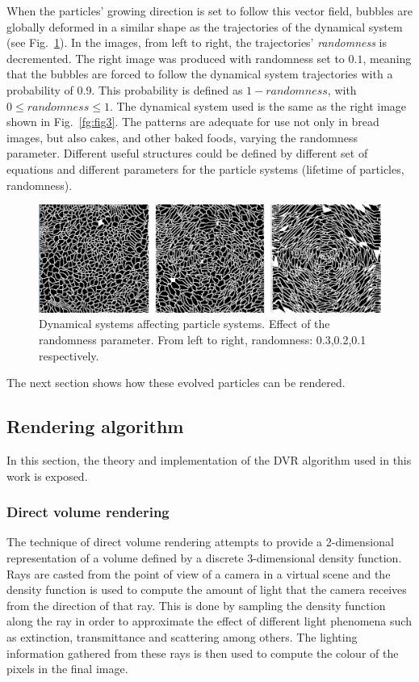 \documentclass[oneside,a4paper,spanish,links]{amca}
\begin{document}
When the particles' growing direction is set to follow this vector field, bubbles are globally deformed in a similar shape as the
trajectories of the dynamical system (see Fig.~\ref{fg:fig4}). In the
images, from left to right, the trajectories' {\em randomness} is decremented. The right image was produced with randomness set to $0.1$, meaning
that the bubbles are forced to follow the dynamical system
trajectories with a probability of 0.9. This probability is defined as
$1-randomness$, with $0 \leq randomness \leq 1$. The dynamical system
used is the same as the right image shown in Fig.~\ref{fg:fig3}.  The
patterns are adequate for use not only in bread images, but also
cakes, and other baked foods, varying the randomness
parameter. Different useful structures could be defined by different set of equations and different parameters for the
particle systems (lifetime of particles, randomness).


\begin{figure}[htb!]
  \centerline{\includegraphics[scale=0.21]{fig4}}
  \caption{Dynamical systems affecting particle systems. Effect of the randomness parameter. From left to right, randomness: 0.3,0.2,0.1 respectively. }
  \label{fg:fig4}
\end{figure}

The next section shows how these evolved particles can be rendered.

\subsection{Rendering algorithm}

In this section, the theory and implementation of the DVR algorithm used in this work is exposed.

\subsubsection{Direct volume rendering}

The technique of direct volume rendering attempts to provide a
2-dimensional representation of a volume defined by a discrete
3-dimensional density function. Rays are casted from the point of view
of a camera in a virtual scene and the density function is used to
compute the amount of light that the camera receives from the
direction of that ray. This is done by sampling the density function
along the ray in order to approximate the effect of different light
phenomena such as extinction, transmittance and scattering among
others. The lighting information gathered from these rays is then
used to compute the colour of the pixels in the final image.
\end{document}

